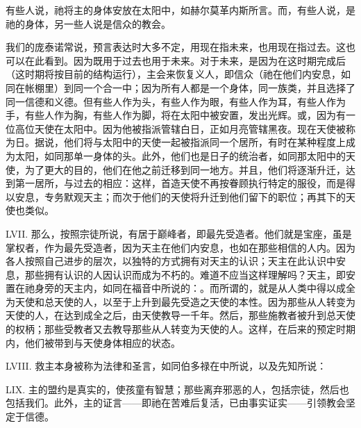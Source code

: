 有些人说，祂将主的身体安放在太阳中，如赫尔莫革内斯所言。而，有些人说，是祂的身体，另一些人说是信众的教会。\par

我们的庞泰诺常说，预言表达时大多不定，用现在指未来，也用现在指过去。这也可以在此看到。因为既用于过去也用于未来。对于未来，是因为在这时期完成后（这时期将按目前的结构运行），主会来恢复义人，即信众（祂在他们内安息，如同在帐棚里）到同一个合一中；因为所有人都是一个身体，同一族类，并且选择了同一信德和义德。但有些人作为头，有些人作为眼，有些人作为耳，有些人作为手，有些人作为胸，有些人作为脚，将在太阳中被安置，发出光辉。或，因为有一位高位天使在太阳中。因为他被指派管辖白日，正如月亮管辖黑夜。现在天使被称为日。据说，他们将与太阳中的天使一起被指派同一个居所，有时在某种程度上成为太阳，如同那单一身体的头。此外，他们也是日子的统治者，如同那太阳中的天使，为了更大的目的，他们在他之前迁移到同一地方。并且，他们将逐渐升迁，达到第一居所，与过去的相应：这样，首造天使不再按眷顾执行特定的服役，而是得以安息，专务默观天主；而次于他们的天使将升迁到他们留下的职位；再其下的天使也类似。\par

LVII. 那么，按照宗徒所说，有居于巅峰者，即最先受造者。他们就是宝座，虽是掌权者，作为最先受造者，因为天主在他们内安息，也如在那些相信的人内。因为各人按照自己进步的层次，以独特的方式拥有对天主的认识；天主在此认识中安息，那些拥有认识的人因认识而成为不朽的。难道不应当这样理解吗？天主，即安置在祂身旁的天主内，如同在福音中所说的：。而所谓的，就是从人类中得以成全为天使和总天使的人，以至于上升到最先受造之天使的本性。因为那些从人转变为天使的人，在达到成全之后，由天使教导一千年。然后，那些施教者被升到总天使的权柄；那些受教者又去教导那些从人转变为天使的人。这样，在后来的预定时期内，他们被带到与天使身体相应的状态。\par

LVIII. 救主本身被称为法律和圣言，如同伯多禄在中所说，以及先知所说：\par

LIX. 主的盟约是真实的，使孩童有智慧；那些离弃邪恶的人，包括宗徒，然后也包括我们。此外，主的证言——即祂在苦难后复活，已由事实证实——引领教会坚定于信德。\par

